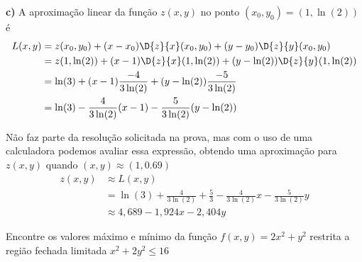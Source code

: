 \documentclass[a4paper,12pt,fleqn]{article}
\begin{document}
\begin{answer}
\vspace{\baselineskip}
\textbf{c)\;}
A aproximação linear da função $z(x, y)$ no ponto \((x_0, y_0) = (1, \ln(2))\) é
\begin{align*}
  L(x, y)
  & = z(x_0, y_0) + (x-x_0)\D{z}{x}(x_0, y_0) + (y-y_0)\D{z}{y}(x_0, y_0) \\
  & = z(1, \ln(2)) + (x-1)\D{z}{x}(1, \ln(2)) + (y-\ln(2))\D{z}{y}(1, \ln(2)) \\
  & = \ln(3) + (x-1)\frac{-4}{3\ln(2)} + (y-\ln(2))\frac{-5}{3\ln(2)} \\
  & = \ln(3) - \frac{4}{3\ln(2)}(x-1) - \frac{5}{3\ln(2)}(y-\ln(2))
\end{align*}

Não faz parte da resolução solicitada na prova, mas com o uso de uma calculadora
podemos avaliar essa expressão, obtendo uma aproximação para $z(x, y)$
quando $(x, y)\approx (1, 0.69)$
\begin{align*}
  z(x, y) & \approx L(x, y) \\
  & = \ln(3)
    + \frac{4}{3\ln(2)}
    + \frac{5}{3}
    - \frac{4}{3\ln(2)} x
    - \frac{5}{3\ln(2)} y \\
  & \approx 4,689 -1,924 x - 2,404 y
\end{align*}
\end{answer}

Encontre os valores máximo e mínimo da função
\(
  f(x, y) = 2x^2 + y^2
\)
restrita a região fechada limitada
\(
  x^2 + 2y^2 \leq 16
\)
\clearpagequestiononly
\end{document}
